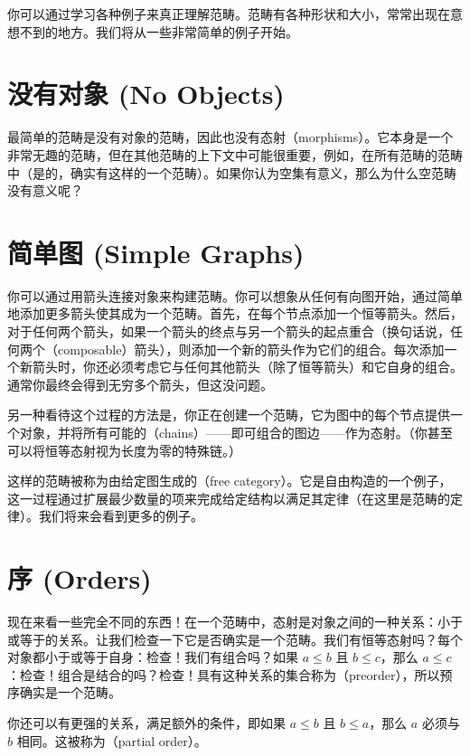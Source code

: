 
\lettrine[lhang=0.17]{你}{可以通过学习各种例子来真正理解范畴}。范畴有各种形状和大小，常常出现在意想不到的地方。我们将从一些非常简单的例子开始。

\section{没有对象 (No Objects)}

最简单的范畴是没有对象的范畴，因此也没有态射（morphisms）。它本身是一个非常无趣的范畴，但在其他范畴的上下文中可能很重要，例如，在所有范畴的范畴中（是的，确实有这样的一个范畴）。如果你认为空集有意义，那么为什么空范畴没有意义呢？

\section{简单图 (Simple Graphs)}

你可以通过用箭头连接对象来构建范畴。你可以想象从任何有向图开始，通过简单地添加更多箭头使其成为一个范畴。首先，在每个节点添加一个恒等箭头。然后，对于任何两个箭头，如果一个箭头的终点与另一个箭头的起点重合（换句话说，任何两个（composable）箭头），则添加一个新的箭头作为它们的组合。每次添加一个新箭头时，你还必须考虑它与任何其他箭头（除了恒等箭头）和它自身的组合。通常你最终会得到无穷多个箭头，但这没问题。

另一种看待这个过程的方法是，你正在创建一个范畴，它为图中的每个节点提供一个对象，并将所有可能的（chains）——即可组合的图边——作为态射。（你甚至可以将恒等态射视为长度为零的特殊链。）

这样的范畴被称为由给定图生成的（free category）。它是自由构造的一个例子，这一过程通过扩展最少数量的项来完成给定结构以满足其定律（在这里是范畴的定律）。我们将来会看到更多的例子。

\section{序 (Orders)}

现在来看一些完全不同的东西！在一个范畴中，态射是对象之间的一种关系：小于或等于的关系。让我们检查一下它是否确实是一个范畴。我们有恒等态射吗？每个对象都小于或等于自身：检查！我们有组合吗？如果 $a \leqslant b$ 且 $b \leqslant c$，那么 $a \leqslant c$：检查！组合是结合的吗？检查！具有这种关系的集合称为（preorder），所以预序确实是一个范畴。

你还可以有更强的关系，满足额外的条件，即如果 $a \leqslant b$ 且 $b \leqslant a$，那么 $a$ 必须与 $b$ 相同。这被称为（partial order）。

